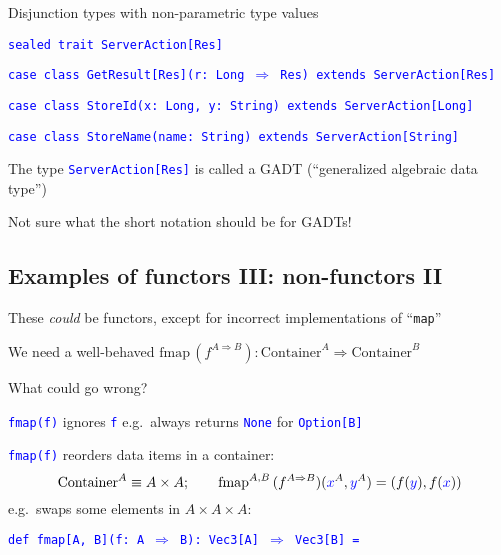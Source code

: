 Disjunction types with non-parametric type values

\texttt{\textcolor{blue}{\footnotesize{}sealed trait ServerAction{[}Res{]}}}{\footnotesize\par}

\texttt{\textcolor{blue}{\footnotesize{}case class GetResult{[}Res{]}(r: Long
$\Rightarrow$ Res) extends ServerAction{[}Res{]}}}{\footnotesize\par}

\texttt{\textcolor{blue}{\footnotesize{}case class StoreId(x: Long,
y: String) extends ServerAction{[}Long{]}}}{\footnotesize\par}

\texttt{\textcolor{blue}{\footnotesize{}case class StoreName(name: String)
extends ServerAction{[}String{]}}}{\footnotesize\par}

The type \texttt{\textcolor{blue}{\footnotesize{}ServerAction{[}Res{]}}}
is called a GADT (``generalized algebraic data type'')

Not sure what the short notation should be for GADTs!


\subsection{Examples of functors III: non-functors II}

These \emph{could} be functors, except for incorrect implementations
of ``\texttt{map}''

We need a well-behaved $\text{fmap}\,(f^{A\Rightarrow B}):\text{Container}^{A}\Rightarrow\text{Container}^{B}$

What could go wrong?

\texttt{\textcolor{blue}{\footnotesize{}fmap(f)}} ignores \texttt{\textcolor{blue}{\footnotesize{}f}}
\textendash{} e.g.\ always returns \texttt{\textcolor{blue}{\footnotesize{}None}}
for \texttt{\textcolor{blue}{\footnotesize{}Option{[}B{]}}}{\footnotesize\par}

\texttt{\textcolor{blue}{\footnotesize{}fmap(f)}} reorders data items
in a container: 
\[
\text{Container}^{A}\equiv A\times A;\qquad\text{fmap}^{A,B}\,(f^{A\Rightarrow B})({\color{blue}x}^{A},{\color{blue}y}^{A})=\left(f({\color{blue}y}),f({\color{blue}x})\right)
\]
e.g.\ swaps some elements in $A\times A\times A$:

\texttt{\textcolor{blue}{\footnotesize{}def fmap{[}A, B{]}(f: A $\Rightarrow$
B): Vec3{[}A{]} $\Rightarrow$ Vec3{[}B{]} =}}{\footnotesize\par}

